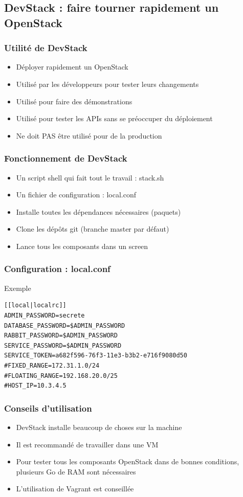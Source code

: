   \subsection[DevStack]{DevStack : faire tourner rapidement un OpenStack}

  \begin{frame}
    \frametitle{Utilité de DevStack}
    \begin{itemize}
      \item Déployer rapidement un OpenStack
      \item Utilisé par les développeurs pour tester leurs changements
      \item Utilisé pour faire des démonstrations
      \item Utilisé pour tester les APIs sans se préoccuper du déploiement
      \item Ne doit PAS être utilisé pour de la production
    \end{itemize}
  \end{frame}

  \begin{frame}
    \frametitle{Fonctionnement de DevStack}
    \begin{itemize}
      \item Un script shell qui fait tout le travail : stack.sh
      \item Un fichier de configuration : local.conf
      \item Installe toutes les dépendances nécessaires (paquets)
      \item Clone les dépôts git (branche master par défaut)
      \item Lance tous les composants dans un screen
    \end{itemize}
  \end{frame}

  \begin{frame}[containsverbatim]
    \frametitle{Configuration : local.conf}
    Exemple
\begin{verbatim}
[[local|localrc]]
ADMIN_PASSWORD=secrete
DATABASE_PASSWORD=$ADMIN_PASSWORD
RABBIT_PASSWORD=$ADMIN_PASSWORD
SERVICE_PASSWORD=$ADMIN_PASSWORD
SERVICE_TOKEN=a682f596-76f3-11e3-b3b2-e716f9080d50
#FIXED_RANGE=172.31.1.0/24
#FLOATING_RANGE=192.168.20.0/25
#HOST_IP=10.3.4.5
\end{verbatim}
  \end{frame}

  \begin{frame}
    \frametitle{Conseils d'utilisation}
    \begin{itemize}
      \item DevStack installe beaucoup de choses sur la machine
      \item Il est recommandé de travailler dans une VM
      \item Pour tester tous les composants OpenStack dans de bonnes conditions, plusieurs Go de RAM sont nécessaires
      \item L'utilisation de Vagrant est conseillée
    \end{itemize}
  \end{frame}

